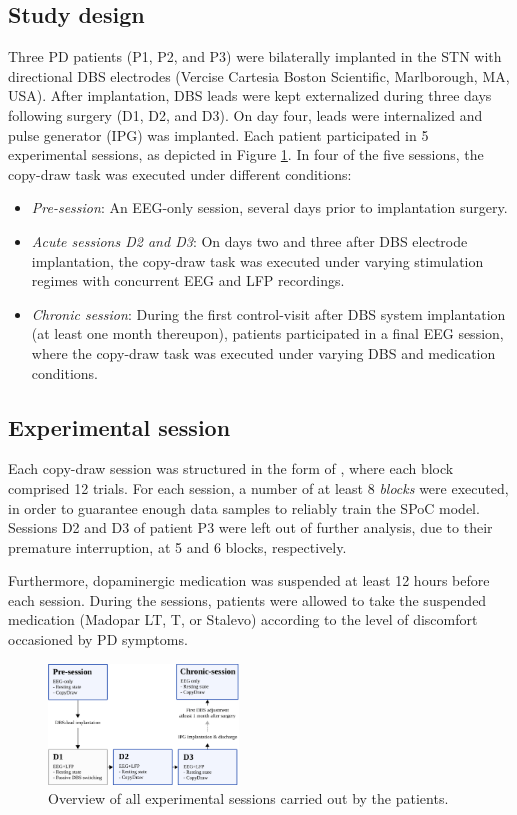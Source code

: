 \documentclass[10pt,a4paper]{article}
\begin{document}
\subsection{Study design}
Three PD patients (P1, P2, and P3) were bilaterally implanted in the STN with directional DBS electrodes (Vercise Cartesia \texttrademark Boston Scientific, Marlborough, MA, USA). After implantation, DBS leads were kept externalized during three days following surgery (D1, D2, and D3). On day four, leads were internalized and pulse generator (IPG) was implanted. Each patient participated in 5 experimental sessions, as depicted in Figure \ref{fig:sessions_overview}. In four of the five sessions, the copy-draw task was executed under different conditions:
\begin{itemize}
\item \textit{Pre-session}: An EEG-only session, several days prior to implantation surgery.
\item \textit{Acute sessions D2 and D3}: On days two and three after DBS electrode implantation, the copy-draw task was executed under varying stimulation regimes with concurrent EEG and LFP recordings.
\item \textit{Chronic session}: During the first control-visit after DBS system implantation (at least one month thereupon), patients participated in a final EEG session, where the copy-draw task was executed under varying DBS and medication conditions.
\end{itemize}

\subsection{Experimental session}
Each copy-draw session was structured in the form of , where each block comprised 12 trials. For each session, a number of at least 8 \textit{blocks} were executed, in order to guarantee enough data samples to reliably train the SPoC model. Sessions D2 and D3 of patient P3 were left out of further analysis, due to their premature interruption, at 5 and 6 blocks, respectively.

Furthermore, dopaminergic medication was suspended at least 12 hours before each session. During the sessions, patients were allowed to take the suspended medication (Madopar LT, T, or Stalevo) according to the level of discomfort occasioned by PD symptoms.

\begin{figure}[h!]
\centering
\includegraphics[width=0.45\textwidth]{figures/all_sessions}
\caption{Overview of all experimental sessions carried out by the patients.}
\label{fig:sessions_overview}
\end{figure}
\end{document}
